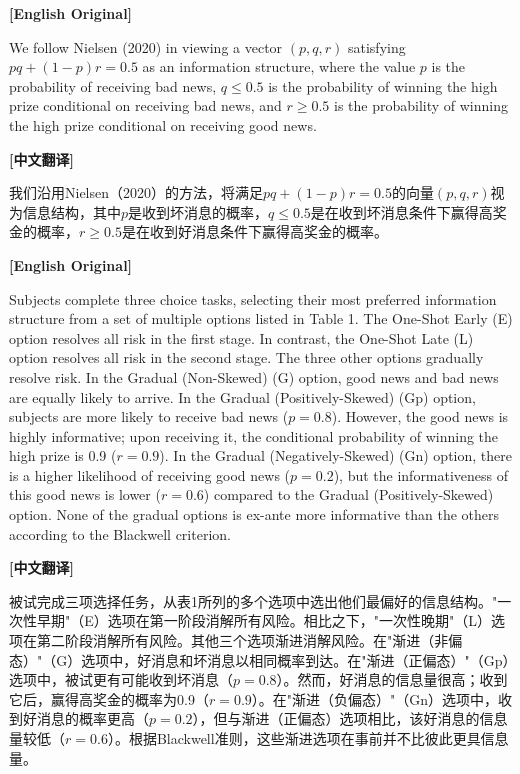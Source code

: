 \documentclass[12pt,a4paper]{ctexart}
\newenvironment{original}{%
  \par\medskip\noindent\textbf{[English Original]}\par\smallskip
  \color{black}\small
}{%
  \par\medskip
}
\newenvironment{translation}{%
  \par\noindent\textbf{[中文翻译]}\par\smallskip
  \color{blue}\small
}{%
  \par\bigskip
}
\theoremstyle{definition}
\theoremstyle{remark}
\begin{document}
\begin{original}
We follow Nielsen (2020) in viewing a vector $(p, q, r)$ satisfying $pq + (1-p)r = 0.5$ as an information structure, where the value $p$ is the probability of receiving bad news, $q \leq 0.5$ is the probability of winning the high prize conditional on receiving bad news, and $r \geq 0.5$ is the probability of winning the high prize conditional on receiving good news.
\end{original}
\begin{translation}
我们沿用Nielsen（2020）的方法，将满足$pq + (1-p)r = 0.5$的向量$(p, q, r)$视为信息结构，其中$p$是收到坏消息的概率，$q \leq 0.5$是在收到坏消息条件下赢得高奖金的概率，$r \geq 0.5$是在收到好消息条件下赢得高奖金的概率。
\end{translation}

\begin{original}
Subjects complete three choice tasks, selecting their most preferred information structure from a set of multiple options listed in Table 1. The One-Shot Early (E) option resolves all risk in the first stage. In contrast, the One-Shot Late (L) option resolves all risk in the second stage. The three other options gradually resolve risk. In the Gradual (Non-Skewed) (G) option, good news and bad news are equally likely to arrive. In the Gradual (Positively-Skewed) (Gp) option, subjects are more likely to receive bad news ($p = 0.8$). However, the good news is highly informative; upon receiving it, the conditional probability of winning the high prize is 0.9 ($r = 0.9$). In the Gradual (Negatively-Skewed) (Gn) option, there is a higher likelihood of receiving good news ($p = 0.2$), but the informativeness of this good news is lower ($r = 0.6$) compared to the Gradual (Positively-Skewed) option. None of the gradual options is ex-ante more informative than the others according to the Blackwell criterion.
\end{original}
\begin{translation}
被试完成三项选择任务，从表1所列的多个选项中选出他们最偏好的信息结构。"一次性早期"（E）选项在第一阶段消解所有风险。相比之下，"一次性晚期"（L）选项在第二阶段消解所有风险。其他三个选项渐进消解风险。在"渐进（非偏态）"（G）选项中，好消息和坏消息以相同概率到达。在"渐进（正偏态）"（Gp）选项中，被试更有可能收到坏消息（$p = 0.8$）。然而，好消息的信息量很高；收到它后，赢得高奖金的概率为0.9（$r = 0.9$）。在"渐进（负偏态）"（Gn）选项中，收到好消息的概率更高（$p = 0.2$），但与渐进（正偏态）选项相比，该好消息的信息量较低（$r = 0.6$）。根据Blackwell准则，这些渐进选项在事前并不比彼此更具信息量。
\end{translation}
\end{document}
